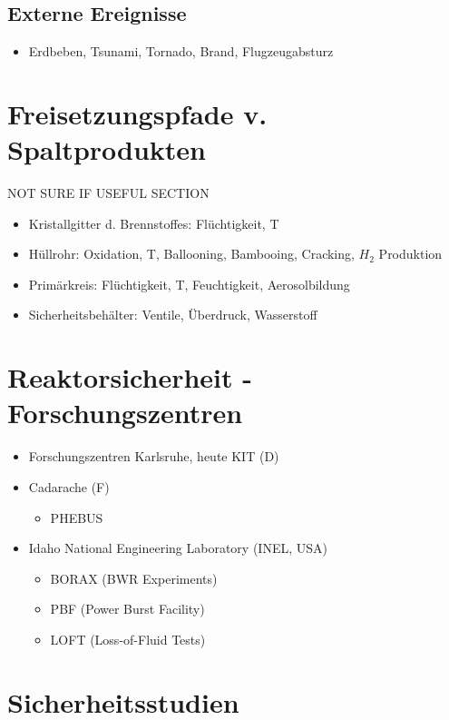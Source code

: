 \documentclass[12pt]{article}
\begin{document}
\subsection{Externe Ereignisse}
\begin{itemize}
  \item Erdbeben, Tsunami, Tornado, Brand, Flugzeugabsturz
\end{itemize}

\section{Freisetzungspfade v. Spaltprodukten}
NOT SURE IF USEFUL SECTION
\begin{itemize}
  \item Kristallgitter d. Brennstoffes: Flüchtigkeit, T
  \item Hüllrohr: Oxidation, T, Ballooning, Bambooing, Cracking, \(H_2\) Produktion
  \item Primärkreis: Flüchtigkeit, T, Feuchtigkeit, Aerosolbildung
  \item Sicherheitsbehälter: Ventile, Überdruck, Wasserstoff
\end{itemize}

\section{Reaktorsicherheit - Forschungszentren}
\begin{itemize}
  \item Forschungszentren Karlsruhe, heute KIT (D)
  \item Cadarache (F)
  \begin{itemize}
    \item PHEBUS
  \end{itemize}
  \item Idaho National Engineering Laboratory (INEL, USA)
  \begin{itemize}
    \item BORAX (BWR Experiments)
    \item PBF (Power Burst Facility)
    \item LOFT (Loss-of-Fluid Tests)
  \end{itemize}
\end{itemize}

\section{Sicherheitsstudien}
\end{document}
